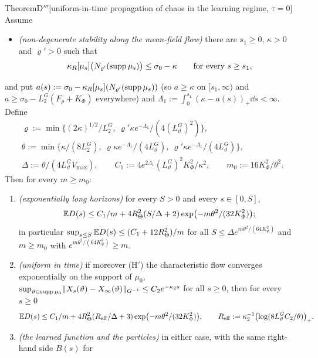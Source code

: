 \begin{thm}{Theorem}{D$'''$}[uniform-in-time propagation of chaos in the learning regime, $\tau = 0$]
Assume
\begin{itemize}[leftmargin=3em]
  \item[\textup{(H)}] \emph{(non-degenerate stability along the mean-field flow)} there are $s_1\ge0$, $\kappa > 0$
    and $\varrho' > 0$ such that
    \[
      \kappa_R[\mu_s]\bigl(N_{\varrho'}(\operatorname{supp}\mu_s)\bigr)\le\sigma_0 - \kappa\qquad\text{for every }s\ge s_1,
    \]
\end{itemize}
and put $a(s) := \sigma_0 - \kappa_R[\mu_s](N_{\varrho'}(\operatorname{supp}\mu_s))$ (so $a\ge\kappa$ on $[s_1,\infty)$ and
$a\ge\sigma_0 - L_2^G(F_\rho + K_\Phi)$ everywhere) and $\Lambda_1 := \int_0^{s_1}(\kappa - a(s))_+\dd s < \infty$.
Define
\begin{gather*}
  \varrho := \min\bigl\{(2\kappa)^{1/2}/L_2^G,\ \varrho'\kappa e^{-\Lambda_1}/(4(L_\vartheta^G)^2)\bigr\},\\
  \theta := \min\bigl\{\kappa/(8L_2^G),\ \varrho\kappa e^{-\Lambda_1}/(4L_\vartheta^G),\ \varrho'\kappa e^{-\Lambda_1}/(4L_\vartheta^G)\bigr\},\\
  \Delta := \theta/(4L_\vartheta^GV_{\max}),\qquad C_1 := 4e^{2\Lambda_1}(L_\vartheta^G)^2K_\Phi^2/\kappa^2,\qquad
  m_0 := 16K_\Phi^2/\theta^2.
\end{gather*}
Then for every $m\ge m_0$:
\begin{enumerate}[label=\textup{(\alph*)}]
  \item \emph{(exponentially long horizons)} for every $S > 0$ and every $s\in[0,S]$,
    \[
      \mathbb{E} D(s)\le C_1/m + 4R_\Theta^2(S/\Delta + 2)\exp\bigl(-m\theta^2/(32K_\Phi^2)\bigr);
    \]
    in particular $\sup_{s\le S}\mathbb{E} D(s)\le(C_1 + 12R_\Theta^2)/m$ for all $S\le\Delta e^{m\theta^2/(64K_\Phi^2)}$ and
    $m\ge m_0$ with $e^{m\theta^2/(64K_\Phi^2)}\ge m$.
  \item \emph{(uniform in time)} if moreover \textup{(H$'$)} the characteristic flow converges exponentially on the
    support of $\mu_0$, $\sup_{\vartheta\in\operatorname{supp}\mu_0}\lVert X_s(\vartheta) - X_\infty(\vartheta)\rVert_{G^{-1}}\le C_2e^{-\kappa_2s}$
    for all $s\ge0$, then for every $s\ge0$
    \[
      \mathbb{E} D(s)\le C_1/m + 4R_\Theta^2(R_{\mathrm{eff}}/\Delta + 3)\exp\bigl(-m\theta^2/(32K_\Phi^2)\bigr),\qquad
      R_{\mathrm{eff}} := \kappa_2^{-1}\bigl(\log(8L_\vartheta^GC_2/\theta)\bigr)_+.
    \]
  \item \emph{(the learned function and the particles)} in either case, with the same right-hand side $B(s)$ for

\end{enumerate}
\end{thm}
